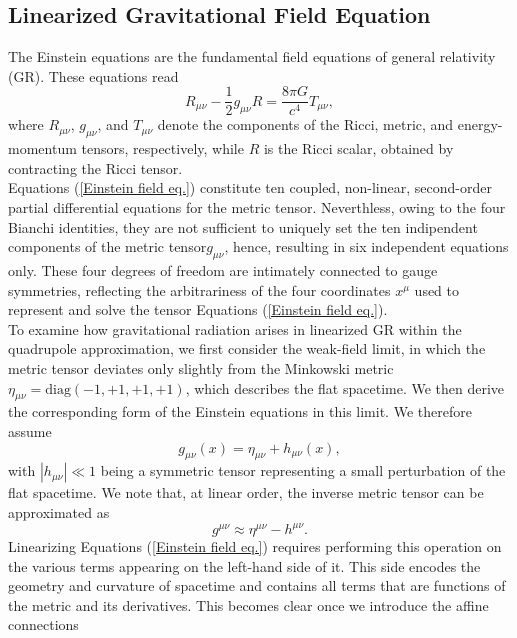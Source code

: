 \documentclass[12pt,twoside,openany]{book}
\begin{document}
\subsection{Linearized Gravitational Field Equation}
The Einstein equations are the fundamental field equations of general relativity (GR). These equations read
\begin{equation}\label{Einstein field eq.}
    R_{\mu \nu}-\frac{1}{2}g_{\mu \nu} R=\frac{8\pi G}{c^4}T_{\mu \nu},
\end{equation}
where $R_{\mu\nu}$, $g_{\mu\nu}$, and $T_{\mu\nu}$ denote the components of the Ricci, metric, and energy-momentum tensors, respectively, while $R$ is the Ricci scalar, obtained by contracting the Ricci tensor.\\Equations (\ref{Einstein field eq.}) constitute ten coupled, non-linear, second-order partial differential equations for the metric tensor. Neverthless, owing to the four  Bianchi identities, they are not sufficient to uniquely set the ten indipendent components of the metric tensor$g_{\mu\nu}$, hence, resulting in six  independent equations only. These four degrees of freedom are intimately connected to gauge symmetries, reflecting the arbitrariness of the four coordinates $x^\mu$ used to represent and solve the tensor Equations (\ref{Einstein field eq.}).\\To examine how gravitational radiation arises in linearized GR within the quadrupole approximation, we first consider the weak-field limit, in which the metric tensor deviates only slightly from the Minkowski metric $\eta_{\mu \nu}=\mathrm{diag}(-1,+1,+1,+1)$, which describes the flat spacetime. We then derive the corresponding form of the Einstein equations in this limit. We therefore assume
\begin{equation}
\label{weak filed metric tensor}
    g_{\mu \nu}(x)=\eta_{\mu \nu}+h_{\mu \nu}(x),
\end{equation}
with $|h_{\mu \nu}|\ll1$ being a symmetric tensor representing a small perturbation of the flat spacetime. We note that, at linear order, the inverse metric tensor can be approximated as
\begin{equation}
 g^{\mu\nu}\approx \eta^{\mu\nu}-h^{\mu\nu}.
\end{equation}
Linearizing Equations (\ref{Einstein field eq.}) requires performing this operation on the various terms appearing on the left-hand side of it. This side encodes the geometry and curvature of spacetime and contains all terms that are functions of the metric and its derivatives. This becomes clear once we introduce the affine connections
\end{document}
